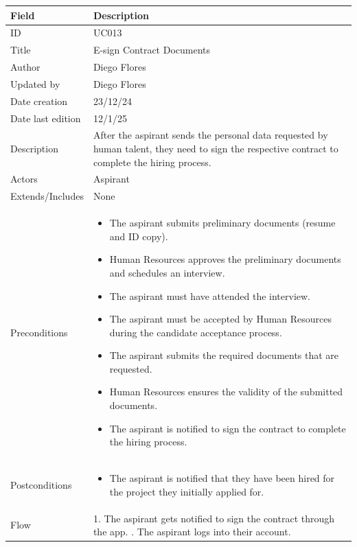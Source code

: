 \documentclass{scrreprt}
\begin{document}
\begin{table}[H]
	\centering
	\begin{tabular}{|p{3cm}|p{10cm}|}
		\hline
		\textbf{Field} & \textbf{Description} \\ \hline
		ID & UC013 \\ \hline
		Title & E-sign Contract Documents \\ \hline
		Author & Diego Flores \\ \hline
		Updated by & Diego Flores \\ \hline
		Date creation & 23/12/24 \\ \hline
		Date last edition & 12/1/25 \\ \hline
		Description & 
		After the aspirant sends the personal data requested by human talent, they need to sign the respective contract to complete the hiring process. \\ \hline
		Actors & Aspirant \\ \hline
		Extends/Includes & None \\ \hline
		Preconditions & 
		\begin{itemize}
			\item The aspirant submits preliminary documents (resume and ID copy).
			\item Human Resources approves the preliminary documents and schedules an interview.
			\item The aspirant must have attended the interview.
			\item The aspirant must be accepted by Human Resources during the candidate acceptance process.
			\item The aspirant submits the required documents that are requested.
			\item Human Resources ensures the validity of the submitted documents.
			\item The aspirant is notified to sign the contract to complete the hiring process.
		\end{itemize} \\ \hline
		Postconditions & 
		\begin{itemize}
			\item The aspirant is notified that they have been hired for the project they initially applied for.
		\end{itemize} \\ \hline
		Flow & 
		1. The aspirant gets notified to sign the contract through the app. \newline
		2. The aspirant logs into their account. \newline

\end{tabular}
\end{table}
\end{document}
